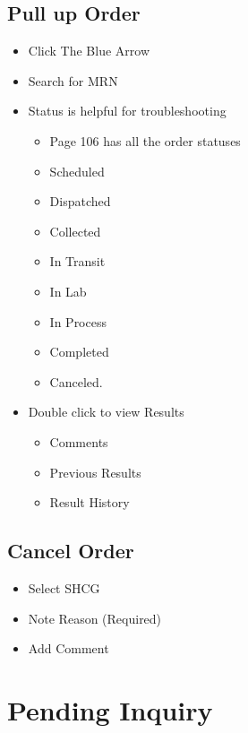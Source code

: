 \section{Pull up Order}

\begin{itemize}
    \item Click The Blue Arrow
    \item Search for MRN
    \item Status is helpful for troubleshooting
        \begin{itemize}
            \item Page 106 has all the order statuses
            \item Scheduled
            \item Dispatched
            \item Collected
            \item In Transit
            \item In Lab
            \item In Process
            \item Completed
            \item Canceled.
        \end{itemize}
    \item Double click to view Results
    \begin{itemize}
        \item Comments
        \item Previous Results
        \item Result History
    \end{itemize}
\end{itemize}

\section{Cancel Order}
\begin{itemize}
    \item Select SHCG
    \item Note Reason (Required)
    \item Add Comment
\end{itemize}

\chapter{Pending Inquiry}
